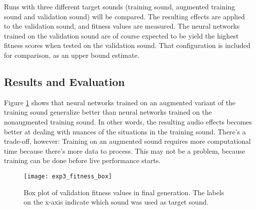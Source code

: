 Runs with three different target sounds (training sound, augmented training sound and validation sound) will be compared. The resulting effects are applied to the validation sound, and fitness values are measured. The neural networks trained on the validation sound are of course expected to be yield the highest fitness scores when tested on the validation sound. That configuration is included for comparison, as an upper bound estimate.


\subsection{Results and Evaluation}
Figure \ref{fig:exp3_fitness_box} shows that neural networks trained on an augmented variant of the training sound generalize better than neural networks trained on the nonaugmented training sound. In other words, the resulting audio effects becomes better at dealing with nuances of the situations in the training sound. There's a trade-off, however: Training on an augmented sound requires more computational time because there's more data to process. This may not be a problem, because training can be done before live performance starts.

\begin{figure}[H]
    \centering
    \texttt{[image: exp3\_fitness\_box]}
    \caption{Box plot of validation fitness values in final generation. The labels on the x-axis indicate which sound was used as target sound.}
    \label{fig:exp3_fitness_box}
\end{figure}
